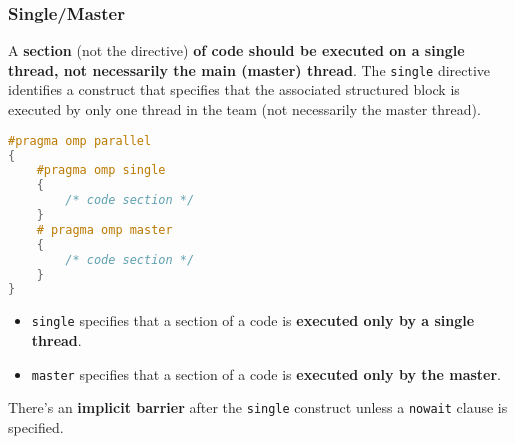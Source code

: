 \subsubsection{Single/Master}

A \textbf{section} (not the directive) \textbf{of code should be executed on a single thread, not necessarily the main (master) thread}. The \texttt{single} directive identifies a construct that specifies that the associated structured block is executed by only one thread in the team (not necessarily the master thread).

\begin{openmpbox}
\begin{lstlisting}[language=C++]
#pragma omp parallel
{
    #pragma omp single
    {
        /* code section */
    }
    # pragma omp master
    {
        /* code section */
    }
}\end{lstlisting}
\end{openmpbox}

\begin{itemize}
    \item \texttt{single} specifies that a section of a code is \textbf{executed only by a single thread}.

    
    \item \texttt{master} specifies that a section of a code is \textbf{executed only by the master}.
\end{itemize}

\noindent
There's an \textbf{implicit barrier} after the \texttt{single} construct unless a \texttt{nowait} clause is specified.
